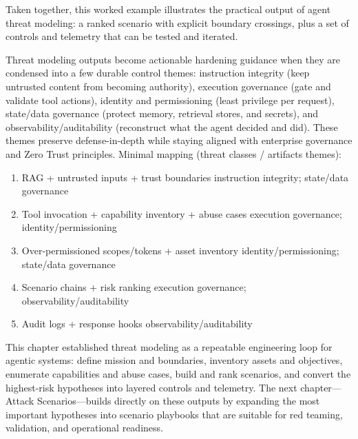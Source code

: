 \begin{TNtwocol}
  Taken together, this worked example illustrates the practical output of agent threat modeling: a ranked scenario with explicit boundary crossings, plus a set of controls and telemetry that can be tested and iterated.

  \medskip

  Threat modeling outputs become actionable hardening guidance when they are condensed into a few durable control themes: instruction integrity (keep untrusted content from becoming authority), execution governance (gate and validate tool actions), identity and permissioning (least privilege per request), state/data governance (protect memory, retrieval stores, and secrets), and observability/auditability (reconstruct what the agent decided and did). These themes preserve defense-in-depth while staying aligned with enterprise governance and Zero Trust principles. \cite{nist-sp800-207,cisa-ztmm-v2,nist-airmf-100-1}
  Minimal mapping (threat classes / artifacts \rightarrow themes):
  \begin{enumerate}
    \item RAG + untrusted inputs + trust boundaries \rightarrow instruction integrity; state/data governance
    \item Tool invocation + capability inventory + abuse cases \rightarrow execution governance; identity/permissioning
    \item Over-permissioned scopes/tokens + asset inventory \rightarrow identity/permissioning; state/data governance
    \item Scenario chains + risk ranking \rightarrow execution governance; observability/auditability
    \item Audit logs + response hooks \rightarrow observability/auditability
  \end{enumerate}

  \medskip

  This chapter established threat modeling as a repeatable engineering loop for agentic systems: define mission and boundaries, inventory assets and objectives, enumerate capabilities and abuse cases, build and rank scenarios, and convert the highest-risk hypotheses into layered controls and telemetry. The next chapter—Attack Scenarios—builds directly on these outputs by expanding the most important hypotheses into scenario playbooks that are suitable for red teaming, validation, and operational readiness.

\end{TNtwocol}

